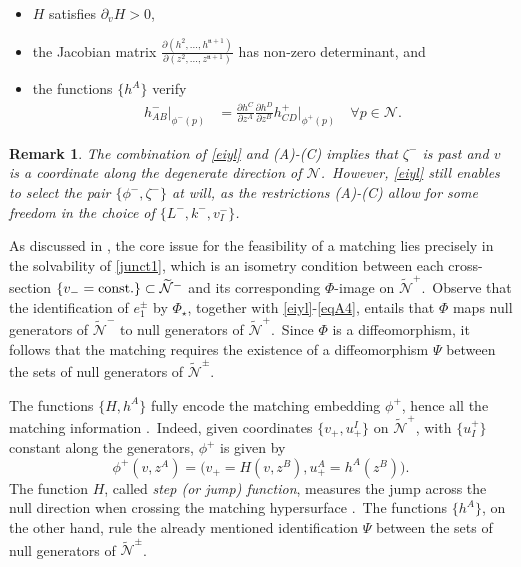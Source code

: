 \documentclass[11pt]{article}
\numberwithin{equation}{section}
\newtheorem{remark}[theorem]{Remark}
\def\n{\mathfrak{n}}
\newcommand\N{\mathcal N}
\newcommand\rig{\zeta}
\def\n{\mathfrak{n}}
\newcommand{\cp}{\partial}
\newcommand{\nullhyp}{\widetilde{\N}}
\begin{document}
\vspace{-0.33cm}

\begin{itemize}\itemsep0cm
\item[$(a)$]  
$H$ satisfies  $\cp_{v}H>0$,  
\item[$(b)$] the Jacobian matrix $\frac{\cp (h^2,...,h^{\n+1})}{\cp(z^2,...,z^{\n+1})}$ has non-zero determinant, and 
\item[$(c)$] the functions $\{h^A\}$ verify 
\begin{align}
	\label{junct1}h^-_{AB}\vert_{\phi^-(p)} &=\frac{\cp h^C}{\cp z^A} \frac{\cp h^D}{\cp z^B}h^+_{CD}\vert_{\phi^+(p)}\quad\forall p\in\N.
\end{align}
\end{itemize}
\begin{remark} 
The combination of \eqref{eiyl} and (A)-(C) implies that $\rig^-$ is past and $v$ is a coordinate along the degenerate direction of $\N$.\ However, 
\eqref{eiyl} still enables to select the pair $\{\phi^-,\rig^-\}$ at will, as the restrictions (A)-(C) allow for some freedom in the choice of $\{L^-,k^-,v^-_I\}$.\ 
\end{remark}
As discussed in \cite{manzano2021null,manzano2023matching}, the core issue for the feasibility of a matching lies precisely in the solvability of 
\eqref{junct1}, which  
is an isometry condition between each cross-section $\{v_-=\textup{const.}\}\subset\nullhyp^-$
and its 
corresponding 
$\Phi$-image on $\nullhyp^+$.\ 
Observe that the identification of $e_1^{\pm}$ by $\Phi_{\star}$, together with \eqref{eiyl}-\eqref{eqA4}, entails that $\Phi$ maps null generators 
of $\nullhyp^-$ to null generators of $\nullhyp^+$.\  
Since $\Phi$ is a diffeomorphism, it follows that the matching requires the existence of a diffeomorphism $\Psi$ between the sets of null generators of $\nullhyp^{\pm}$.\ 

The functions 
$\{H,h^A\}$ fully encode  
the matching embedding $\phi^+$, hence all the matching information  \cite{manzano2021null}.\ 
Indeed, given coordinates $\{v_{+},u^{I}_+\}$ on $\nullhyp^+$, with $\{u_I^+\}$ constant along the generators, 
$\phi^+$ is given by
\begin{equation}
\label{embedPhi+}\phi^+(v,z^A)=\big(v_+=H(v,z^B),u^A_+=h^A(z^B)\big).
\end{equation}
The function $H$, called \textit{step (or jump) function},  
measures the jump across the null direction when crossing the matching hypersurface \cite{manzano2021null}.\ The functions $\{h^A\}$, on the other hand, rule the already mentioned identification $\Psi$ between  
the sets of null generators of $\nullhyp^{\pm}$.\ 
\end{document}
